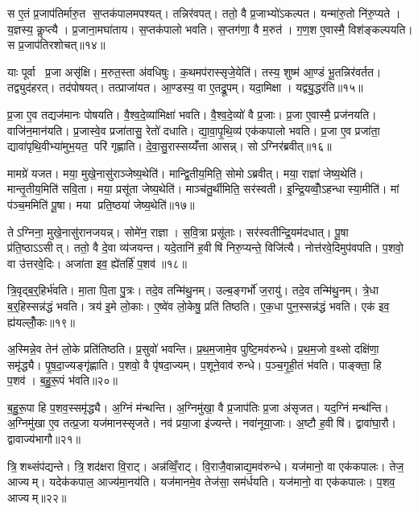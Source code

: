 स ए॒तं प्र॒जाप॑तिर्मारु॒त स॒प्तक॑पालमपश्यत्। तन्निर॑वपत्। ततो॒ वै प्र॒जाभ्यो॑ऽकल्पत। यन्मा॑रु॒तो नि॑रु॒प्यते। य॒ज्ञस्य॒ कॢप्त्यै। प्र॒जाना॒मघा॑ताय। स॒प्तक॑पालो भवति। स॒प्तग॑णा॒ वै म॒रुत॑। ग॒ण॒श ए॒वास्मै॒ विश॑ङ्कल्पयति। स प्र॒जाप॑तिरशोचत्॥१४॥

याः पूर्वा प्र॒जा असृ॑क्षि। म॒रुत॒स्ता अ॑वधिषुः। क॒थमप॑रास्सृजे॒येति॑। तस्य॒ शुष्म॑ आ॒ण्डं भू॒तन्निर॑वर्तत। तद्व्युद॑हरत्। तद॑पोषयत्। तत्प्राजा॑यत। आ॒ण्डस्य॒ वा ए॒तद्रू॒पम्। यदा॒मिक्षा। यद्व्यु॒द्धर॑ति॥१५॥

प्र॒जा ए॒व तद्यज॑मानः पोषयति। वै॒श्व॒दे॒व्या॑मिक्षा॑ भवति। वै॒श्व॒दे॒व्यो॑ वै प्र॒जाः। प्र॒जा ए॒वास्मै॒ प्रज॑नयति। वाजि॑न॒मान॑यति। प्र॒जास्वे॒व प्रजा॑तासु॒ रेतो॑ दधाति। द्या॒वा॒पृ॒थि॒व्य॑ एक॑कपालो भवति। प्र॒जा ए॒व प्रजा॑ता॒ द्यावा॑पृथि॒वीभ्या॑मुभ॒यत॒ परि॑ गृह्णाति। दे॒वा॒सु॒रास्सय्यँ॑त्ता आसन्न्। सोऽग्निर॑ब्रवीत्॥१६॥

मामग्रे॑ यजत। मया॒ मुखे॒नासु॑राञ्जेष्य॒थेति॑। मान्द्वि॒तीय॒मिति॒ सोमोऽब्रवीत्। मया॒ राज्ञा॑ जेष्य॒थेति॑। मान्तृ॒तीय॒मिति॑ सवि॒ता। मया॒ प्रसू॑ता जेष्य॒थेति॑। माञ्च॑तु॒र्थीमिति॒ सर॑स्वती। इ॒न्द्रि॒यव्वोँ॒ऽहन्धास्या॒मीति॑। मां प॑ञ्च॒ममिति॑ पू॒षा। मया प्रति॒ष्ठया॑ जेष्य॒थेति॑॥१७॥

तेऽग्निना॒ मुखे॒नासु॑रानजयन्न्। सोमे॑न॒ राज्ञा। स॒वि॒त्रा प्रसू॑ताः। सर॑स्वतीन्द्रि॒यम॑दधात्। पू॒षा प्र॑ति॒ष्ठाऽऽसीत्। ततो॒ वै दे॒वा व्य॑जयन्त। यदे॒तानि॑ ह॒वीषि॑ निरु॒प्यन्ते॒ विजि॑त्यै। नोत्त॑रवे॒दिमुप॑वपति। प॒शवो॒ वा उ॑त्तरवे॒दिः। अजा॑ता इव॒ ह्ये॑तर्\mbox{}हि॑ प॒शव॑॥१८॥\anuvakamend[ऐ॒दित्य॑शोचद्व्यु॒द्धर॑त्यब्रवीत्प्रति॒ष्ठया॑ जेष्य॒थेत्ये॒तर्\mbox{}हि॑ प॒शव॑]

त्रि॒वृद्ब॒र्॒हिर्भ॑वति। मा॒ता पि॒ता पु॒त्रः। तदे॒व तन्मि॑थु॒नम्। उल्ब॒ङ्गर्भो॑ ज॒रायु॑। तदे॒व तन्मि॑थु॒नम्। त्रे॒धा ब॒र्॒हिस्सन्न॑द्धं भवति। त्रय॑ इ॒मे लो॒काः। ए॒ष्वे॑व लो॒केषु॒ प्रति॑ तिष्ठति। ए॒क॒धा पुन॒स्सन्न॑द्धं भवति। एक॑ इव॒ ह्य॑यल्लोँ॒कः॥१९॥

अ॒स्मिन्ने॒व तेन॑ लो॒के प्रति॑तिष्ठति। प्र॒सुवो॑ भवन्ति। प्र॒थ॒म॒जामे॒व पुष्टि॒मव॑रुन्धे। प्र॒थ॒म॒जो व॒थ्सो दक्षि॑णा॒ समृ॑द्ध्यै। पृ॒ष॒दा॒ज्यङ्गृ॑ह्णाति। प॒शवो॒ वै पृ॑षदा॒ज्यम्। प॒शूने॒वाव॑ रुन्धे। प॒ञ्च॒गृ॒ही॒तं भ॑वति। पाङ्क्ता॒ हि प॒शव॑। ब॒हु॒रू॒पं भ॑वति॥२०॥

ब॒हु॒रू॒पा हि प॒शव॒स्समृ॑द्ध्यै। अ॒ग्निं म॑न्थन्ति। अ॒ग्निमु॑खा॒ वै प्र॒जाप॑तिः प्र॒जा अ॑सृजत। यद॒ग्निं मन्थ॑न्ति। अ॒ग्निमु॑खा ए॒व तत्प्र॒जा यज॑मानस्सृजते। नव॑ प्रया॒जा इ॑ज्यन्ते। नवा॑नूया॒जाः। अ॒ष्टौ ह॒वीषि॑। द्वावा॑घा॒रौ। द्वावाज्य॑भागौ॥२१॥

त्रि॒शथ्संप॑द्यन्ते। त्रि॒शद॑क्षरा वि॒राट्। अन्न॑व्विँ॒राट्। वि॒राजै॒वान्नाद्य॒मव॑रुन्धे। यज॑मानो॒ वा एक॑कपालः। तेज॒ आज्यम्। यदेक॑कपाल॒ आज्य॑मा॒नय॑ति। यज॑मानमे॒व तेज॑सा॒ सम॑र्धयति। यज॑मानो॒ वा एक॑कपालः। प॒शव॒ आज्यम्॥२२॥

